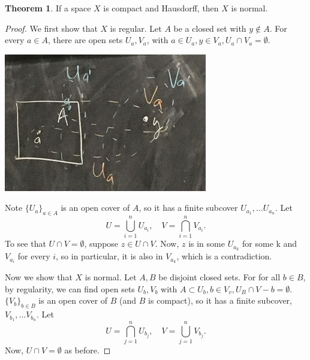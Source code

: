 \documentclass[a5paper]{article}
\theoremstyle{definition}%
\newtheorem{theorem}{Theorem}
\numberwithin{exercise}{section}
\theoremstyle{remark}%
\begin{document}
\begin{highlight}
\begin{theorem}
If a space $X$ is compact and Hausdorff, then $X$ is normal.
\end{theorem}
\end{highlight}
\begin{proof}
We first show that $X$ is regular. Let $A$ be a closed set with $y\not\in A$. For every $a\in A$, there are open sets $U_a, V_a$, with $a\in U_a, y\in V_a, U_a\cap V_a = \emptyset$. 

\begin{center}
\includegraphics[scale=.4]{images/separation_2}
\end{center}

Note $\{U_a\}_{a\in A}$ is an open cover of $A$, so it has a finite subcover $U_{a_1}, \ldots U_{a_n}$. Let 
$$U=\bigcup_{i=1}^n U_{a_i}, \quad V=\bigcap_{i=1}^n V_{a_i}. $$
To see that $U\cap V=\emptyset$, suppose $z\in U\cap V$. Now, $z$ is in some $U_{a_k}$ for some k and $V_{a_i}$ for every $i$, so in particular, it is also in $V_{a_k}$, which is a contradiction.\qedwhite

Now we show that $X$ is normal. Let $A,B$ be disjoint closed sets. For for all $b\in B$, by regularity, we can find open sets $U_b, V_b$ with $A\subset U_b, b\in V_v, U_B\cap V-b=\emptyset$. $\{V_b\}_{b\in B}$ is an open cover of $B$ (and $B$ is compact), so it has a finite subcover, $V_{b_1}, \ldots V_{b_n}$. Let 
$$U=\bigcap_{j=1}^n U_{b_j}, \quad V=\bigcup_{j=1}^n V_{b_j}. $$
Now, $U\cap V=\emptyset$ as before. 
\end{proof}
\end{document}
